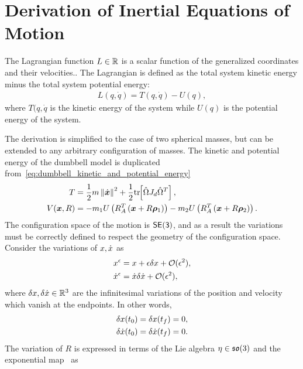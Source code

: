
\chapter{Derivation of Inertial Equations of Motion}\label{proof:inertial_dumbbell_eoms}
The Lagrangian function \( L \in \mathbb{R} \) is a scalar function of the generalized coordinates and their velocities..
The Lagrangian is defined as the total system kinetic energy minus the total system potential energy:
\begin{align*}
    L(q, \dot{q} ) = T(q, \dot{q}) - U (q) ,
\end{align*}
where \( T(q, \dot{q} \) is the kinetic energy of the system while \( U(q) \) is the potential energy of the system.

The derivation is simplified to the case of two spherical masses, but can be extended to any arbitrary configuration of masses.
The kinetic and potential energy of the dumbbell model is duplicated from~\cref{eq:dumbbell_kinetic_and_potential_energy} 
\begin{align*}
    T &= \frac{1}{2} m \left\| \dot{\bm{x}} \right\|^2 + \frac{1}{2} \mathrm{tr}\negthickspace\left[ \hat{\Omega} J_d \hat{\Omega}^T \right] , \\
    V( \bm{x}, R ) &=  - m_1 U \left( R_A^T \left( \bm{x} + R \bm{\rho}_1 \right) \right) - m_2 U \left( R_A^T \left( \bm{x} + R \bm{\rho}_2 \right) \right) .
\end{align*}
The configuration space of the motion is \( \mathsf{SE(3)} \), and as a result the variations must be correctly defined to respect the geometry of the configuration space.
Consider the variations of \( x, \dot{x} \) as
\begin{align}
    x^\epsilon &= x + \epsilon \delta x + \mathcal{O}(\epsilon^2), \label{eq:inertial_pos_variation} \\
    \dot{x}^\epsilon &= \dot{x} \delta \dot{x} + \mathcal{O}(\epsilon^2), \label{eq:inertial_vel_variation}
\end{align}
where \( \delta x, \delta \dot{x} \in \mathbb{R}^3 \) are the infinitesimal variations of the position and velocity which vanish at the endpoints.
In other words,
\begin{align*}
    \delta x (t_0) &= \delta x (t_f ) = 0, \\
    \delta \dot{x} (t_0) &= \delta \dot{x} (t_f) = 0 .
\end{align*}
The variation of \( R \) is expressed in terms of the Lie algebra \( \eta \in \mathfrak{so}(3) \) and the exponential map~\cite{hall2015} as
